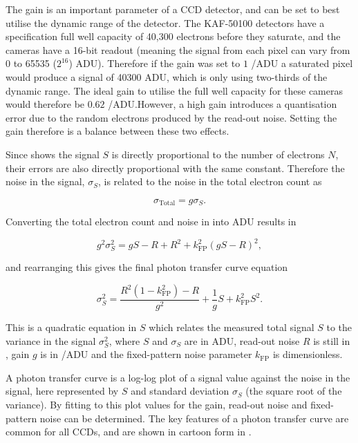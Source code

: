 \begin{colsection}
\begin{colsection}
The gain is an important parameter of a CCD detector, and can be set to best utilise the dynamic range of the detector. The KAF-50100 detectors have a specification full well capacity of 40,300 electrons before they saturate, and the cameras have a 16-bit readout (meaning the signal from each pixel can vary from 0 to 65535 ($2^{16}$) ADU). Therefore if the gain was set to $1$ \elec/ADU a saturated pixel would produce a signal of 40300 ADU, which is only using two-thirds of the dynamic range. The ideal gain to utilise the full well capacity for these cameras would therefore be $0.62$ \elec/ADU.\@ However, a high gain introduces a quantisation error due to the random electrons produced by the read-out noise. Setting the gain therefore is a balance between these two effects.

Since  shows the signal $S$ is directly proportional to the number of electrons $N$, their errors are also directly proportional with the same constant. Therefore the noise in the signal, $\sigma_S$, is related to the noise in the total electron count as

\begin{equation}
    \sigma_\text{Total} = g \sigma_S.
    \label{eq:noise_gain}
\end{equation}

Converting the total electron count and noise in  into ADU results in

\begin{equation}
    g^2\sigma_S^2 = gS - R + R^2 + k_\text{FP}^2 {(gS - R)}^2,
    \label{eq:ptc_noise2}
\end{equation}

and rearranging this gives the final photon transfer curve equation

\begin{equation}
    \sigma_S^2 = \frac{R^2(1-k_\text{FP}^2) - R}{g^2} + \frac{1}{g}S + k_\text{FP}^2 S^2.
    \label{eq:ptc}
\end{equation}

This is a quadratic equation in $S$ which relates the measured total signal $S$ to the variance in the signal $\sigma_S^2$, where $S$ and $\sigma_S$ are in ADU, read-out noise $R$ is still in \elec, gain $g$ is in \elec/ADU and the fixed-pattern noise parameter $k_\text{FP}$ is dimensionless.

A photon transfer curve is a log-log plot of a signal value against the noise in the signal, here represented by $S$ and standard deviation $\sigma_S$ (the square root of the variance). By fitting  to this plot values for the gain, read-out noise and fixed-pattern noise can be determined. The key features of a photon transfer curve are common for all CCDs, and are shown in cartoon form in .


\end{colsection}
\end{colsection}

